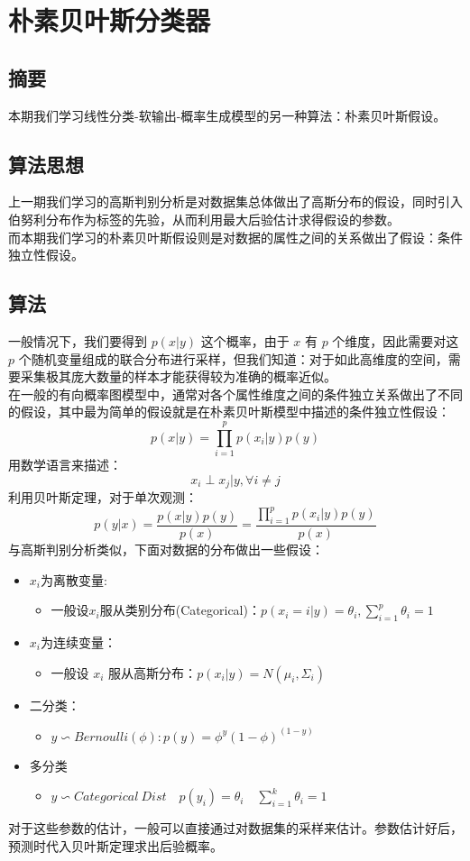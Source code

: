 \documentclass{report}
\begin{document}
\chapter{朴素贝叶斯分类器}
\section{摘要}
本期我们学习线性分类-软输出-概率生成模型的另一种算法：朴素贝叶斯假设。
\section{算法思想}
上一期我们学习的高斯判别分析是对数据集总体做出了高斯分布的假设，同时引入伯努利分布作为标签的先验，从而利用最大后验估计求得假设的参数。\\
而本期我们学习的朴素贝叶斯假设则是对数据的属性之间的关系做出了假设：条件独立性假设。
\section{算法}
一般情况下，我们要得到 $p(x|y)$ 这个概率，由于 $x$ 有 $p$ 个维度，因此需要对这 $p$ 个随机变量组成的联合分布进行采样，但我们知道：对于如此高维度的空间，需要采集极其庞大数量的样本才能获得较为准确的概率近似。\\
在一般的有向概率图模型中，通常对各个属性维度之间的条件独立关系做出了不同的假设，其中最为简单的假设就是在朴素贝叶斯模型中描述的条件独立性假设：
$$
p(x|y)=\prod_{i=1}^p p(x_i|y)p(y)
$$
用数学语言来描述：
$$
x_{i} \perp x_{j} | y, \forall i \neq j
$$
利用贝叶斯定理，对于单次观测：
$$
p(y|x)=\frac{p(x|y)p(y)}{p(x)}=\frac{\prod_{i=1}^p p(x_i|y)p(y)}{p(x)}
$$
与高斯判别分析类似，下面对数据的分布做出一些假设：
\begin{itemize}
	\item $x_i$为离散变量:
	\begin{itemize}
	\item 一般设$x_i$服从类别分布(Categorical)：$p(x_i=i|y)=\theta_i,\sum_{i=1}^p \theta_i =1$
	\end{itemize}
	\item $x_i$为连续变量：
	\begin{itemize}
	\item 一般设 $x_i$ 服从高斯分布：$p(x_i|y)=N(\mu_i, \Sigma_i)$
	\end{itemize}
	\item 二分类：	
	\begin{itemize}
	\item $y \backsim Bernoulli(\phi):p(y)=\phi^y (1-\phi)^{(1-y)}$ 
	\end{itemize}
	\item 多分类
	\begin{itemize}
	\item $y \backsim Categorical\ Dist\quad p(y_i)=\theta_i\quad \sum_{i=1}^k \theta_i=1$
	\end{itemize}
\end{itemize}
对于这些参数的估计，一般可以直接通过对数据集的采样来估计。参数估计好后，预测时代入贝叶斯定理求出后验概率。
\end{document}
